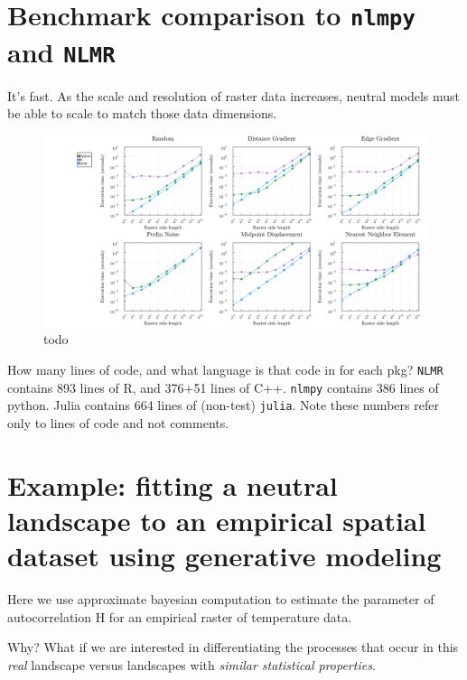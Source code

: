 \documentclass[11pt]{article}
\makeatletter
\def\maxwidth{\ifdim\Gin@nat@width>\linewidth\linewidth
\else\Gin@nat@width\fi}
\let\Oldincludegraphics\includegraphics
\renewcommand{\includegraphics}[1]{\Oldincludegraphics[width=\maxwidth]{#1}}
\makeatother
\begin{document}
\hypertarget{benchmark-comparison-to-nlmpy-and-nlmr}{%
\section{\texorpdfstring{Benchmark comparison to \texttt{nlmpy} and
\texttt{NLMR}}{Benchmark comparison to nlmpy and NLMR}}\label{benchmark-comparison-to-nlmpy-and-nlmr}}

It's fast. As the scale and resolution of raster data increases, neutral
models must be able to scale to match those data dimensions.

\begin{figure}
\centering
\includegraphics{./figures/benchmark.png}
\caption{todo}
\end{figure}

How many lines of code, and what language is that code in for each pkg?
\texttt{NLMR} contains 893 lines of R, and 376+51 lines of C++.
\texttt{nlmpy} contains 386 lines of python. Julia contains 664 lines of
(non-test) \texttt{julia}. Note these numbers refer only to lines of
code and not comments.

\hypertarget{example-fitting-a-neutral-landscape-to-an-empirical-spatial-dataset-using-generative-modeling}{%
\section{Example: fitting a neutral landscape to an empirical spatial
dataset using generative
modeling}\label{example-fitting-a-neutral-landscape-to-an-empirical-spatial-dataset-using-generative-modeling}}

Here we use approximate bayesian computation to estimate the parameter
of autocorrelation H for an empirical raster of temperature data.

Why? What if we are interested in differentiating the processes that
occur in this \emph{real} landscape versus landscapes with \emph{similar
statistical properties}.
\end{document}
